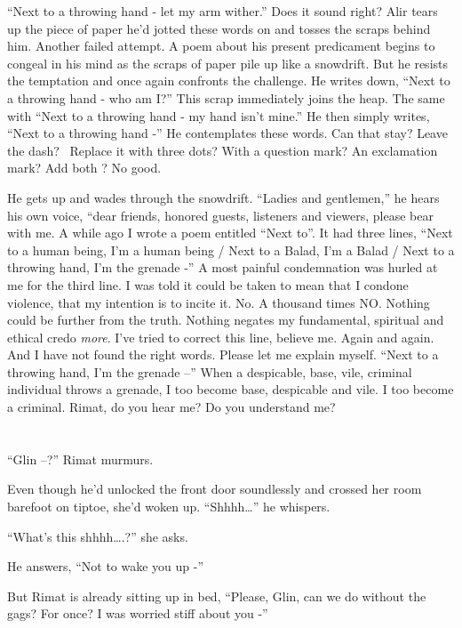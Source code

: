 \documentclass[twoside,11pt]{book}
\begin{document}
``Next to a throwing hand - let my arm wither.'' Does it sound right? Alir tears up the piece of paper
he'd jotted these words on and tosses the scraps behind him. Another failed
attempt. A poem about his present predicament begins to congeal in his mind as the scraps of paper pile up like a
snowdrift. But he resists the temptation and once again confronts the challenge. He writes down, ``Next to
a throwing hand - who am I?'' This scrap immediately joins the heap. The same with ``Next to
a throwing hand - my hand isn't mine.'' He then simply writes,
``Next to a throwing hand -'' He contemplates these words. Can that stay? Leave the dash?
\ Replace it with three dots? With a question mark? An exclamation mark? Add both ? No good.

He gets up and wades through the snowdrift. ``Ladies and gentlemen,'' he hears his own voice,
``dear friends, honored guests, listeners and viewers, please bear with me. A while ago I wrote a poem
entitled ``Next to''. It had  three lines, ``Next to  a human being, I'm a human
being  / Next to a Balad, I'm a Balad  / Next to a throwing hand, I'm the grenade -'' A most
painful condemnation was hurled at me for the third line. I was told it could be taken to mean that I
condone violence, that my intention is to incite it. No. A thousand times NO. Nothing could be further from the
truth. Nothing negates my fundamental, spiritual and ethical credo \textit{more}. I've tried to correct this line,
believe me. Again and again. And I have not found the right words. Please let me explain myself. ``Next to
a throwing hand, I'm the grenade --'' When a despicable, base, vile, criminal individual throws a grenade,
I too become base, despicable and vile. I too become a criminal. Rimat, do
you hear me? Do you understand me?



\chapter{}

``Glin --?'' Rimat murmurs.

Even though he'd unlocked the front door soundlessly and crossed her room barefoot on tiptoe, she'd woken up.
``Shhhh{\dots}'' he whispers.

``What's this shhhh{\dots}.?'' she asks.

He answers, ``Not to wake you up -''

But Rimat is already sitting up in bed, ``Please, Glin, can we do without the gags? For once? I was worried
stiff about you -''
\end{document}
